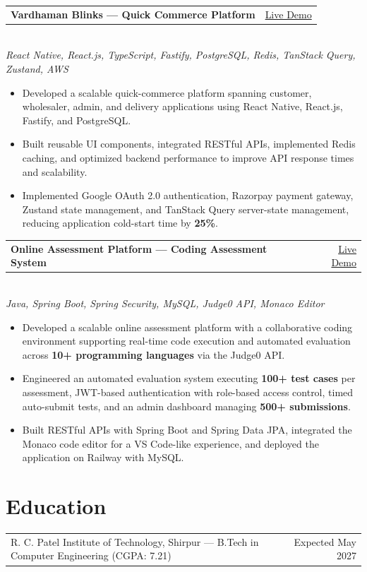 \documentclass[9pt]{extarticle}
\makeatletter
\newcommand{\entryheader}[2]{%
  \noindent\begin{tabularx}{\linewidth}{@{}X r@{}}
    \textbf{#1} & #2
  \end{tabularx}%
}
\newcommand{\normalentryheader}[2]{%
\noindent\begin{tabularx}{\linewidth}{@{}X r@{}}
#1 & #2
\end{tabularx}%
}
\makeatother
\begin{document}
\entryheader{Vardhaman Blinks --- Quick Commerce Platform}{\href{http://13.206.89.98/agents/RAK740A}{Live Demo}}\\
\textit{\small React Native, React.js, TypeScript, Fastify, PostgreSQL, Redis, TanStack Query, Zustand, AWS}
\begin{itemize}
  \item Developed a scalable quick-commerce platform spanning customer, wholesaler, admin, and delivery applications using React Native, React.js, Fastify, and PostgreSQL.
  \item Built reusable UI components, integrated RESTful APIs, implemented Redis caching, and optimized backend performance to improve API response times and scalability.
  \item Implemented Google OAuth 2.0 authentication, Razorpay payment gateway, Zustand state management, and TanStack Query server-state management, reducing application cold-start time by \textbf{25\%}.
\end{itemize}

\entryheader{Online Assessment Platform --- Coding Assessment System}{\href{https://fundmanagement.krushnarpanchitspvtltd.in/login}{Live Demo}}\\
\textit{\small Java, Spring Boot, Spring Security, MySQL, Judge0 API, Monaco Editor}
\begin{itemize}
  \item Developed a scalable online assessment platform with a collaborative coding environment supporting real-time code execution and automated evaluation across \textbf{10+ programming languages} via the Judge0 API.
  \item Engineered an automated evaluation system executing \textbf{100+ test cases} per assessment, JWT-based authentication with role-based access control, timed auto-submit tests, and an admin dashboard managing \textbf{500+ submissions}.
  \item Built RESTful APIs with Spring Boot and Spring Data JPA, integrated the Monaco code editor for a VS Code-like experience, and deployed the application on Railway with MySQL.
\end{itemize}



\section*{Education}

\normalentryheader{R. C. Patel Institute of Technology, Shirpur --- B.Tech in Computer Engineering (CGPA: 7.21)}{Expected May 2027}
\end{document}
